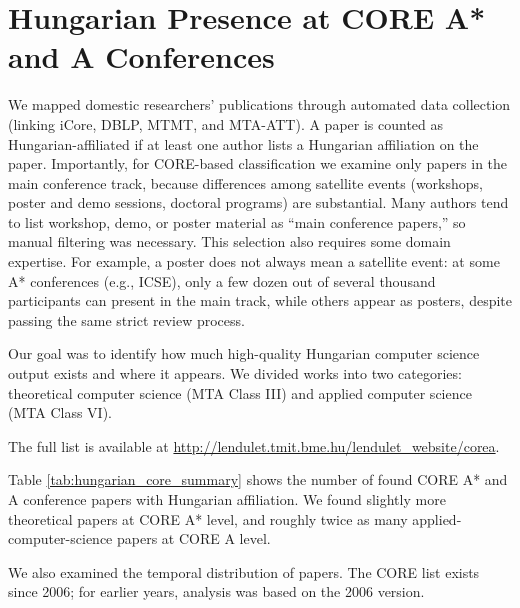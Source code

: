 \documentclass[12pt,a4paper]{article}
\begin{document}
\section{Hungarian Presence at CORE A\!* and A Conferences}

We mapped domestic researchers' publications through automated data collection (linking iCore, DBLP, MTMT, and MTA-ATT). A paper is counted as Hungarian-affiliated if at least one author lists a Hungarian affiliation on the paper. Importantly, for CORE-based classification we examine only papers in the main conference track, because differences among satellite events (workshops, poster and demo sessions, doctoral programs) are substantial. Many authors tend to list workshop, demo, or poster material as ``main conference papers,'' so manual filtering was necessary. This selection also requires some domain expertise. For example, a poster does not always mean a satellite event: at some A\!* conferences (e.g., ICSE), only a few dozen out of several thousand participants can present in the main track, while others appear as posters, despite passing the same strict review process.

Our goal was to identify how much high-quality Hungarian computer science output exists and where it appears. We divided works into two categories: theoretical computer science (MTA Class III) and applied computer science (MTA Class VI).

The full list is available at \url{http://lendulet.tmit.bme.hu/lendulet_website/corea}.



Table \ref{tab:hungarian_core_summary} shows the number of found CORE A\!* and A conference papers with Hungarian affiliation.
We found slightly more theoretical papers at CORE A\!* level, and roughly twice as many applied-computer-science papers at CORE A level.

We also examined the temporal distribution of papers. The CORE list exists since 2006; for earlier years, analysis was based on the 2006 version.
\end{document}
